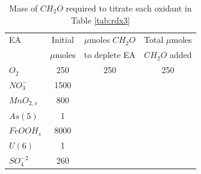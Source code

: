 \begin{table}[h]
\caption{Mass of $CH_2O$ required to titrate each oxidant in Table \ref{tab:rdx3}}
\begin{center}
\begin{tabular}{lccc} 
\hline

EA	        & Initial         & $\mu$moles $CH_2O$ 	 & Total $\mu$moles  \\
            &   $\mu$moles    &  to deplete EA       &  $CH_2O$ added    \\ \hline
$O_2$	      &     250	        &       250	           &     250        \\
$NO_3^-$    &	1500            &                      &                \\		
$MnO_{2,s}$	& 800	            &                      &                \\	
$As(5)$	    & 1               &                      &                \\		
$FeOOH_s$	  & 8000            &                      &                \\		
$U(6)$      &	1               &                      &                \\		
$SO_4^{-2}$	& 260             &                      &                \\	 \hline

\end{tabular}
\label{tab:rdx6}
\end{center}
\end{table}


